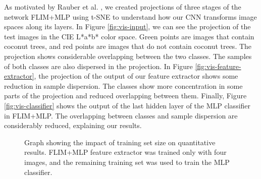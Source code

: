 \documentclass[journal, twoside]{IEEEtran}
\begin{document}
As motivated by Rauber et al. \cite{rauber2016visualizing}, we created projections of three stages of the network FLIM+MLP using t-SNE \cite{maaten2008visualizing} to understand how our CNN transforms image spaces along its layers. In Figure \ref{fig:vis-input}, we can see the projection of the test images in the CIE L*a*b* color space. Green points are images that contain coconut trees, and red points are images that do not contain coconut trees. The projection shows considerable overlapping between the two classes. The samples of both classes are also dispersed in the projection. In Figure \ref{fig:vis-feature-extractor}, the projection of the output of our feature extractor shows some reduction in sample dispersion. The classes show more concentration in some parts of the projection and reduced overlapping between them. Finally, Figure \ref{fig:vis-classifier} shows the output of the last hidden layer of the MLP classifier in FLIM+MLP. The overlapping between classes and sample dispersion are considerably reduced, explaining our results.





\begin{figure}
\caption{Graph showing the impact of training set size on quantitative results. FLIM+MLP feature extractor was trained only with four images, and the remaining training set was used to train the MLP classifier.}
\end{figure}
\end{document}
